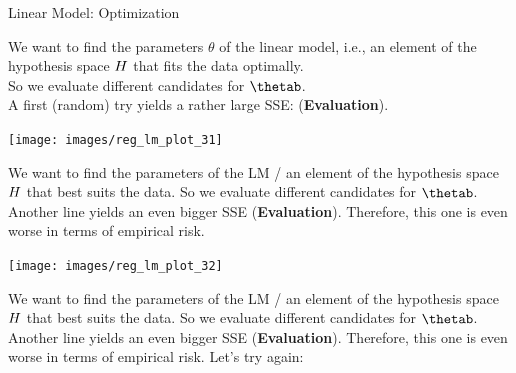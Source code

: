 \documentclass[11pt,compress,t,notes=noshow, xcolor=table]{beamer}
\newenvironment{knitrout}{}{} %
\begin{document}
\begin{vbframe}{Linear Model: Optimization}

We want to find the parameters $\theta$ of the linear model, i.e., an element of the hypothesis space $H$ that fits the data optimally.\\

So we evaluate different candidates for $\thetab$.\\

A first (random) try yields a rather large SSE: (\textbf{Evaluation}).
\lz

\begin{knitrout}\scriptsize
{}\color{fgcolor}

{\centering \texttt{[image: images/reg\_lm\_plot\_31]} 

}



\end{knitrout}

\framebreak

We want to find the parameters of the LM / an element of the hypothesis space $H$ that best suits the data.
So we evaluate different candidates for $\thetab$.\\

Another line yields an even bigger SSE (\textbf{Evaluation}). Therefore, this one is even worse in
terms of empirical risk.

\begin{knitrout}\scriptsize
{}\color{fgcolor}

{\centering \texttt{[image: images/reg\_lm\_plot\_32]} 

}



\end{knitrout}

\framebreak

We want to find the parameters of the LM / an element of the hypothesis space $H$ that best suits the data.
So we evaluate different candidates for $\thetab$.\\

Another line yields an even bigger SSE (\textbf{Evaluation}). Therefore, this one is even worse in
terms of empirical risk. Let's try again:

\begin{knitrout}\scriptsize
{}\color{fgcolor}


\end{knitrout}
\end{vbframe}
\end{document}
